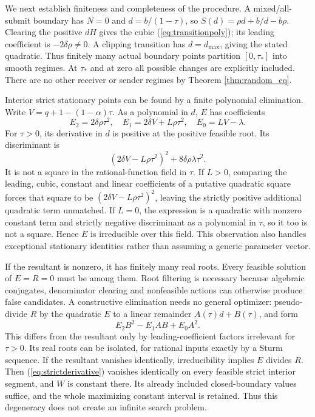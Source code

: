 \documentclass[11pt]{article}
\begin{document}
We next establish finiteness and completeness of the procedure. A mixed/all-submit boundary has $N=0$ and $d=b/(1-\tau)$, so $S(d)=\rho d+b/d-b\rho$. Clearing the positive $dH$ gives the cubic (\ref{eq:transitionpoly}); its leading coefficient is $-2\delta\rho\ne0$. A clipping transition has $d=d_{\max}$, giving the stated quadratic. Thus finitely many actual boundary points partition $[0,\tau_*]$ into smooth regimes. At $\tau_*$ and at zero all possible changes are explicitly included. There are no other receiver or sender regimes by Theorem \ref{thm:random_eq}.

Interior strict stationary points can be found by a finite polynomial elimination. Write $V=q+1-(1-\alpha)\tau$. As a polynomial in $d$, $E$ has coefficients
\[
E_2=2\delta\rho\tau^2,\quad E_1=2\delta V+L\rho\tau^2,\quad E_0=LV-\lambda.
\]
For $\tau>0$, its derivative in $d$ is positive at the positive feasible root. Its discriminant is
\[
(2\delta V-L\rho\tau^2)^2+8\delta\rho\lambda\tau^2.
\]
It is not a square in the rational-function field in $\tau$. If $L>0$, comparing the leading, cubic, constant and linear coefficients of a putative quadratic square forces that square to be $(2\delta V-L\rho\tau^2)^2$, leaving the strictly positive additional quadratic term unmatched. If $L=0$, the expression is a quadratic with nonzero constant term and strictly negative discriminant as a polynomial in $\tau$, so it too is not a square. Hence $E$ is irreducible over this field. This observation also handles exceptional stationary identities rather than assuming a generic parameter vector.

If the resultant is nonzero, it has finitely many real roots. Every feasible solution of $E=R=0$ must be among them. Root filtering is necessary because algebraic conjugates, denominator clearing and nonfeasible actions can otherwise produce false candidates. A constructive elimination needs no general optimizer: pseudo-divide $R$ by the quadratic $E$ to a linear remainder $A(\tau)d+B(\tau)$, and form
\[
E_2 B^2-E_1AB+E_0 A^2.
\]
This differs from the resultant only by leading-coefficient factors irrelevant for $\tau>0$. Its real roots can be isolated, for rational inputs exactly by a Sturm sequence. If the resultant vanishes identically, irreducibility implies $E$ divides $R$. Then (\ref{eq:strictderivative}) vanishes identically on every feasible strict interior segment, and $W$ is constant there. Its already included closed-boundary values suffice, and the whole maximizing constant interval is retained. Thus this degeneracy does not create an infinite search problem.
\end{document}
